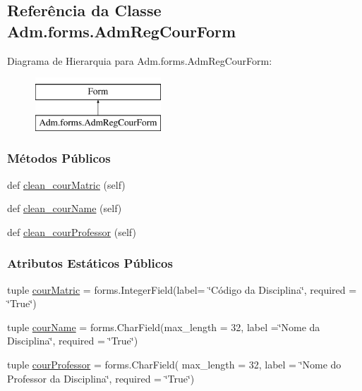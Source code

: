 \hypertarget{classAdm_1_1forms_1_1AdmRegCourForm}{}\subsection{Referência da Classe Adm.\+forms.\+Adm\+Reg\+Cour\+Form}
\label{classAdm_1_1forms_1_1AdmRegCourForm}
Diagrama de Hierarquia para Adm.\+forms.\+Adm\+Reg\+Cour\+Form\+:\begin{figure}[H]
\begin{center}
\leavevmode
\includegraphics[height=2.000000cm]{df/d14/classAdm_1_1forms_1_1AdmRegCourForm}
\end{center}
\end{figure}
\subsubsection*{Métodos Públicos}
\begin{DoxyCompactItemize}
\item 
def \hyperlink{classAdm_1_1forms_1_1AdmRegCourForm_af3ca03aa2519663ae34da3fc0b50f0c2}{clean\+\_\+cour\+Matric} (self)
\item 
def \hyperlink{classAdm_1_1forms_1_1AdmRegCourForm_aeb652e7a2dcd9a7d38ce6f6626533a22}{clean\+\_\+cour\+Name} (self)
\item 
def \hyperlink{classAdm_1_1forms_1_1AdmRegCourForm_adbe479c6c4b7fa2d51b67b4c6223398f}{clean\+\_\+cour\+Professor} (self)
\end{DoxyCompactItemize}
\subsubsection*{Atributos Estáticos Públicos}
\begin{DoxyCompactItemize}
\item 
tuple \hyperlink{classAdm_1_1forms_1_1AdmRegCourForm_a5030e7e3ac46b325e10adc6d39ea9736}{cour\+Matric} = forms.\+Integer\+Field(label= \char`\"{}Código da Disciplina\char`\"{}, required = \char`\"{}True\char`\"{})
\item 
tuple \hyperlink{classAdm_1_1forms_1_1AdmRegCourForm_afc325feb749069ea57387630cc0acc5a}{cour\+Name} = forms.\+Char\+Field(max\+\_\+length = 32, label =\char`\"{}Nome da Disciplina\char`\"{}, required = \char`\"{}True\char`\"{})
\item 
tuple \hyperlink{classAdm_1_1forms_1_1AdmRegCourForm_a6fcfad36a149364899dc7c95f239691f}{cour\+Professor} = forms.\+Char\+Field( max\+\_\+length = 32, label = \char`\"{}Nome do Professor da Disciplina\char`\"{}, required = \char`\"{}True\char`\"{})
\end{DoxyCompactItemize}


